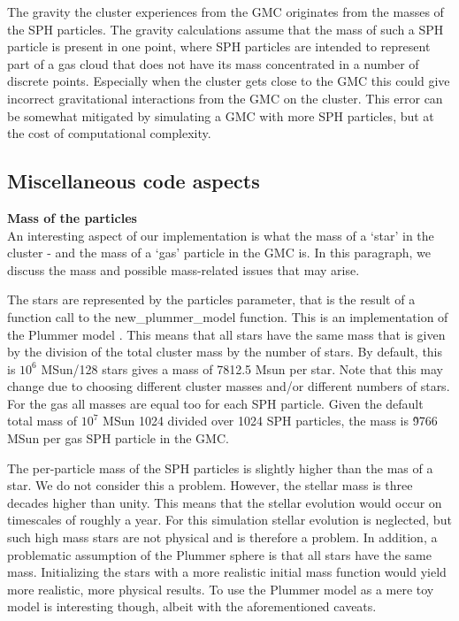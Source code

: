 \documentclass{aa}
\begin{document}
The gravity the cluster experiences from the GMC originates from the masses of the SPH particles. The gravity calculations assume that the mass of such a SPH particle is present in one point, where SPH particles are intended to represent part of a gas cloud that does not have its mass concentrated in a number of discrete points. Especially when the cluster gets close to the GMC this could give incorrect gravitational interactions from the GMC on the cluster. This error can be somewhat mitigated by simulating a GMC with more SPH particles, but at the cost of computational complexity.



\subsection{Miscellaneous code aspects} \label{sec:code}
\noindent \textbf{Mass of the particles} \\
An interesting aspect of our implementation is what the mass of a `star' in the cluster - and the mass of a `gas' particle in the GMC is. In this paragraph, we discuss the mass and possible mass-related issues that may arise.

The stars are represented by the particles parameter, that is the result of a function call to the new\_plummer\_model function. This is an implementation of the Plummer model \citep{1911MNRAS..71..460P}. This means that all stars have the same mass that is given by the division of the total cluster mass by the number of stars. By default, this is $10^6$ MSun/128 stars gives a mass of 7812.5 Msun per star. Note that this may change due to choosing different cluster masses and/or different numbers of stars. For the gas all masses are equal too for each SPH particle. Given the default total mass of $10^7$ MSun 1024 divided over 1024 SPH particles, the mass is \~9766 MSun per gas SPH particle in the GMC. 

The per-particle mass of the SPH particles is slightly higher than the mas of a star. We do not consider this a problem. However, the stellar mass is three decades higher than unity. This means that the stellar evolution would occur on timescales of roughly a year. For this simulation stellar evolution is neglected, but such high mass stars are not physical and is therefore a problem. In addition, a problematic assumption of the Plummer sphere is that all stars have the same mass. Initializing the stars with a more realistic initial mass function would yield more realistic, more physical results. To use the Plummer model as a mere toy model is interesting though, albeit with the aforementioned caveats.
\end{document}
